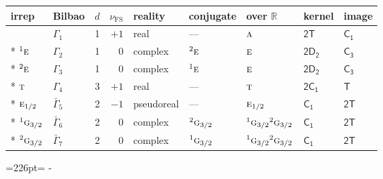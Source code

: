 \documentclass[10pt,a4paper]{article}
\makeatletter
\def\grouprule#1#2{\noalign{\marks\LTgroupmarks{\the\belowrulesep}\nobreak\vskip#1%
  \vskip\aboverulesep}\multispan\LT@cols\unskip{\leaders\hrule\@height#2\hfill\kern\z@}\cr
  \noalign{\penalty\LTrulebreak\vskip\belowrulesep\global\@lastruleclass\z@}}
\newcommand{\needspace}[1]{\par\penalty-100\begingroup\dimen0=#1\relax\dimen2=\pagegoal
  \advance\dimen2-\pagetotal\ifdim\dimen0>\dimen2\relax\ifdim\dimen2>0pt\vfil\break\fi\fi
  \endgroup}
\numberwithin{equation}{section}
\newcommand{\grp}[1]{\mathsf{#1}}
\newcommand{\irr}[1]{\text{\normalfont\scshape #1}}
\newcommand{\conjpair}[1]{{}^{#1}}
\newcommand{\detbox}[1]{{\setlength{\fboxsep}{1pt}\fbox{#1}}}
\newcommand{\fsind}{\nu_{\mathrm{FS}}}
\makeatother
\begin{document}
\setlength{\emergencystretch}{2em}\par\setlength{\emergencystretch}{0pt}
{\small\renewcommand{\arraystretch}{1.25}\setlength{\tabcolsep}{4pt}\begin{longtable}{@{}llrrlllll@{}}\toprule
irrep & Bilbao & $d$ & $\fsind$ & reality & conjugate & over $\mathbb{R}$ & kernel & image\\\midrule\endhead
\bottomrule\endfoot\endlastfoot
\detbox{$\irr{a}$} & $\Gamma_{1}$ & 1 & $+1$ & real & --- & $\irr{a}$ & \href{2T.pdf}{$\grp{2T}$} & \href{../../../rotation/data/pdf/C1.pdf}{$\grp{C_{1}}$}\\*
$\conjpair{1}\irr{e}$ & $\Gamma_{2}$ & 1 & $0$ & complex & $\conjpair{2}\irr{e}$ & $\irr{e}$ & \href{2D2.pdf}{$\grp{2D_{2}}$} & \href{../../../rotation/data/pdf/C3.pdf}{$\grp{C_{3}}$}\\*
$\conjpair{2}\irr{e}$ & $\Gamma_{3}$ & 1 & $0$ & complex & $\conjpair{1}\irr{e}$ & $\irr{e}$ & \href{2D2.pdf}{$\grp{2D_{2}}$} & \href{../../../rotation/data/pdf/C3.pdf}{$\grp{C_{3}}$}\\*
$\irr{t}$ & $\Gamma_{4}$ & 3 & $+1$ & real & --- & $\irr{t}$ & \href{2C1.pdf}{$\grp{2C_{1}}$} & \href{../../../rotation/data/pdf/T.pdf}{$\grp{T}$}\\*
\grouprule{0pt}{\lightrulewidth}
$\irr{e}_{1/2}$ & $\bar{\Gamma}_{5}$ & 2 & $-1$ & pseudoreal & --- & $\irr{e}_{1/2}$ & \href{C1.pdf}{$\grp{C_{1}}$} & \href{2T.pdf}{$\grp{2T}$}\\*
$\conjpair{1}\irr{g}_{3/2}$ & $\bar{\Gamma}_{6}$ & 2 & $0$ & complex & $\conjpair{2}\irr{g}_{3/2}$ & $\conjpair{1}\irr{g}_{3/2}\conjpair{2}\irr{g}_{3/2}$ & \href{C1.pdf}{$\grp{C_{1}}$} & \href{2T.pdf}{$\grp{2T}$}\\*
$\conjpair{2}\irr{g}_{3/2}$ & $\bar{\Gamma}_{7}$ & 2 & $0$ & complex & $\conjpair{1}\irr{g}_{3/2}$ & $\conjpair{1}\irr{g}_{3/2}\conjpair{2}\irr{g}_{3/2}$ & \href{C1.pdf}{$\grp{C_{1}}$} & \href{2T.pdf}{$\grp{2T}$}\\
\bottomrule\end{longtable}}
\needspace{226pt}
\end{document}
